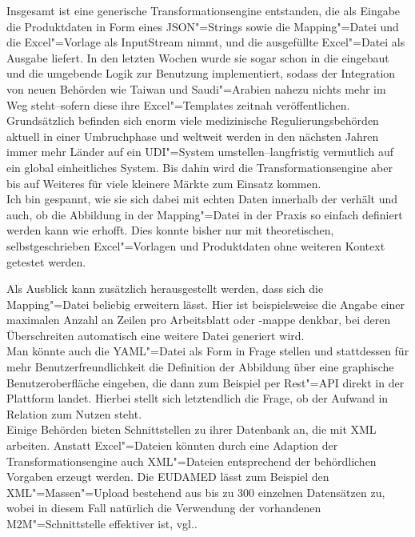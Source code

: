 Insgesamt ist eine generische Transformationsengine entstanden, die als Eingabe die Produktdaten in Form eines JSON"=Strings sowie die Mapping"=Datei und die Excel"=Vorlage als InputStream nimmt, und die ausgefüllte Excel"=Datei als Ausgabe liefert. In den letzten Wochen wurde sie sogar schon in die  eingebaut und die umgebende Logik zur Benutzung implementiert, sodass der Integration von neuen Behörden wie Taiwan und Saudi"=Arabien nahezu nichts mehr im Weg steht\nbs --\nbs sofern diese ihre Excel"=Templates zeitnah veröffentlichen.\\
Grundsätzlich befinden sich enorm viele medizinische Regulierungsbehörden aktuell in einer Umbruchphase und weltweit werden in den nächsten Jahren immer mehr Länder auf ein UDI"=System umstellen\nbs --\nbs langfristig vermutlich auf ein global einheitliches System. Bis dahin wird die Transformationsengine aber bis auf Weiteres für viele kleinere Märkte zum Einsatz kommen. \\
Ich bin gespannt, wie sie sich dabei mit echten Daten innerhalb der  verhält und auch, ob die Abbildung in der Mapping"=Datei in der Praxis so einfach definiert werden kann wie erhofft. Dies konnte bisher nur mit theoretischen, selbstgeschrieben Excel"=Vorlagen und Produktdaten ohne weiteren Kontext getestet werden. 

Als Ausblick kann zusätzlich herausgestellt werden, dass sich die Mapping"=Datei beliebig erweitern lässt. Hier ist beispielsweise die Angabe einer maximalen Anzahl an Zeilen pro Arbeitsblatt oder -mappe denkbar, bei deren Überschreiten automatisch eine weitere Datei generiert wird.\\
Man könnte auch die YAML"=Datei als Form in Frage stellen und stattdessen für mehr Benutzerfreundlichkeit die Definition der Abbildung über eine graphische Benutzeroberfläche eingeben, die dann zum Beispiel per Rest"=API direkt in der Plattform landet. Hierbei stellt sich letztendlich die Frage, ob der Aufwand in Relation zum Nutzen steht.\\
Einige Behörden bieten Schnittstellen zu ihrer Datenbank an, die mit XML arbeiten. Anstatt Excel"=Dateien könnten durch eine Adaption der Transformationsengine auch XML"=Dateien entsprechend der behördlichen Vorgaben erzeugt werden. Die EUDAMED lässt zum Beispiel den XML"=Massen"=Upload bestehend aus bis zu 300 einzelnen Datensätzen zu, wobei in diesem Fall natürlich die Verwendung der vorhandenen M2M"=Schnittstelle effektiver ist, vgl.\nbs\cite{udi:eudamed}.


